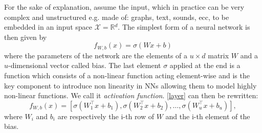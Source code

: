 \documentclass[LaM,binding=0.6cm]{./packages/sapthesis/sapthesis}
\begin{document}
            For the sake of explanation, assume the input, which in practice can be very complex and unstructured e.g. made of: graphs, text, sounds, ecc, to be embedded in an input space  $\mathcal{X} = \mathbb{R}{^d}$.
            The simplest form of a neural network is then given by
            \begin{equation}
                \label{layer}
                f_{W, b}\left(x\right) = \sigma(Wx + b)
            \end{equation}
            where the parameters of the network are the elements of a $u \times d$ matrix $ W $ and a $u$-dimensional vector called bias. The last element $ \sigma $ applied at the end is a
            function which consists of a non-linear function acting element-wise and is the key component to introduce non linearity in NNs allowing them to model 
            highly non-linear functions. We call it \textit{activation function}. \ref{layer} can then be rewritten:
            \begin{equation}
                f_{W, b}\left(x\right) = \left[\sigma(W_1^{\intercal} x + b_1), \sigma(W_2^{\intercal} x + b_2), \ldots, \sigma(W_u^{\intercal} x + b_u)\right],
            \end{equation}
            where $W_i$ and $b_i$ are respectively the i-th row of $W$ and the i-th element of the bias.
            
\end{document}
